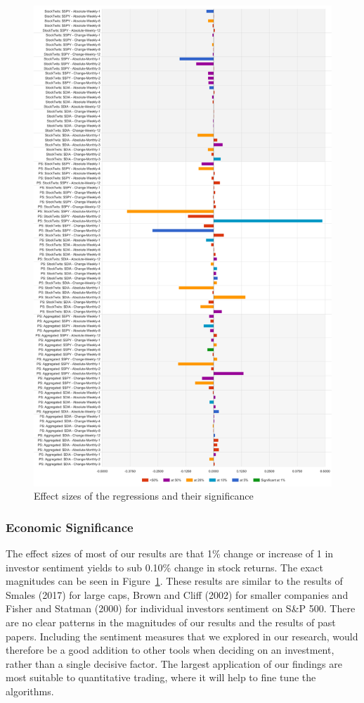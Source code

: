 \newpage
\begin{figure}[h]
\centering
\includegraphics[width=.95\textwidth]{figures/sickExcelBars.png}
\caption{\label{fig:excelbars}Effect sizes of the regressions and their significance}
\end{figure}

\subsubsection{Economic Significance}
The effect sizes of most of our results are that 1\% change or increase of 1 in investor sentiment yields to sub 0.10\% change in stock returns. The exact magnitudes can be seen in Figure~\ref{fig:excelbars}. These results are similar to the results of Smales (2017) for large caps, Brown and Cliff (2002) for smaller companies and Fisher and Statman (2000) for individual investors sentiment on S\&P 500. There are no clear patterns in the magnitudes of our results and the results of past papers. Including the sentiment measures that we explored in our research, would therefore be a good addition to other tools when deciding on an investment, rather than a single decisive factor. The largest application of our findings are most suitable to quantitative trading, where it will help to fine tune the algorithms. 

